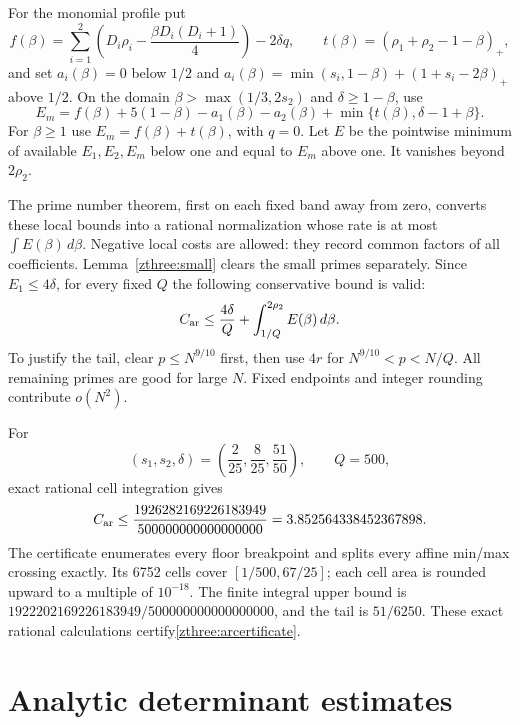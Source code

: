 \documentclass[11pt]{article}
\theoremstyle{definition}\newtheorem{definition}[theorem]{Definition}
\theoremstyle{remark}\newtheorem{remark}[theorem]{Remark}
\begin{document}
For the monomial profile put
\[
 f(\beta)=\sum_{i=1}^2\left(D_i\rho_i-
           \frac{\beta D_i(D_i+1)}4\right)-2\delta q,
 \qquad t(\beta)=(\rho_1+\rho_2-1-\beta)_+,
\]
and set $a_i(\beta)=0$ below $1/2$ and
$a_i(\beta)=\min(s_i,1-\beta)+(1+s_i-2\beta)_+$ above $1/2$.
On the domain $\beta>\max(1/3,2s_2)$ and $\delta\ge1-\beta$, use
\[
 E_m=f(\beta)+5(1-\beta)-a_1(\beta)-a_2(\beta)
                       +\min\{t(\beta),\delta-1+\beta\}.
\]
For $\beta\ge1$ use $E_m=f(\beta)+t(\beta)$, with $q=0$.
Let $E$ be the pointwise minimum of available $E_1,E_2,E_m$ below
one and equal to $E_m$ above one. It vanishes beyond $2\rho_2$.

The prime number theorem, first on each fixed band away from zero,
converts these local bounds into a rational normalization whose rate is
at most $\int E(\beta)\,d\beta$. Negative local costs are allowed:
they record common factors of all coefficients. Lemma~\ref{zthree:small}
clears the small primes separately. Since $E_1\le4\delta$, for every
fixed $Q$ the following conservative bound is valid:
\begin{equation}\label{zthree:car}
 C_{\rm ar}\le\frac{4\delta}{Q}
                +\int_{1/Q}^{2\rho_2}E(\beta)\,d\beta.
\end{equation}
To justify the tail, clear $p\le N^{9/10}$ first, then use $4r$
for $N^{9/10}<p<N/Q$. All remaining primes are good for large $N$.
Fixed endpoints and integer rounding contribute $o(N^2)$.

For
\begin{equation}\label{zthree:parameters}
 (s_1,s_2,\delta)=\left(\frac2{25},\frac8{25},\frac{51}{50}\right),
 \qquad Q=500,
\end{equation}
exact rational cell integration gives
\begin{equation}\label{zthree:arcertificate}
 C_{\rm ar}\le
 \frac{1926282169226183949}{500000000000000000}
 =3.852564338452367898.
\end{equation}
The certificate enumerates every floor breakpoint and splits every
affine min/max crossing exactly. Its 6752 cells cover
$[1/500,67/25]$; each cell area is rounded upward to a multiple of
$10^{-18}$. The finite integral upper bound is
$1922202169226183949/500000000000000000$, and the tail is $51/6250$.
These exact rational calculations certify\eqref{zthree:arcertificate}.


\section{Analytic determinant estimates}
\label{z3a:section}
\end{document}
